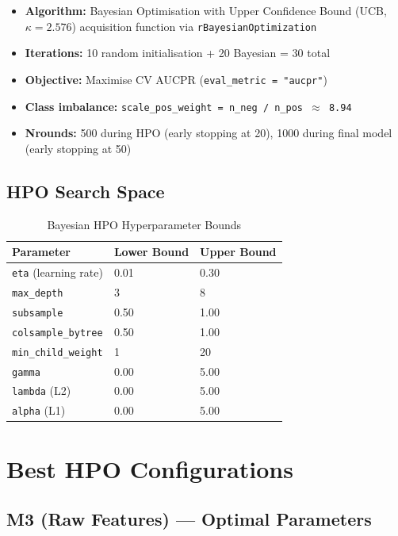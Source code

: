 \documentclass{report}\usepackage[]{graphicx}\usepackage[table]{xcolor}
\begin{document}
\begin{itemize}
    \item \textbf{Algorithm:} Bayesian Optimisation with Upper Confidence Bound 
    (UCB, $\kappa = 2.576$) acquisition function via \texttt{rBayesianOptimization}
    \item \textbf{Iterations:} 10 random initialisation + 20 Bayesian = 30 total
    \item \textbf{Objective:} Maximise CV AUCPR (\texttt{eval\_metric = "aucpr"})
    \item \textbf{Class imbalance:} \texttt{scale\_pos\_weight = n\_neg / n\_pos $\approx$ 8.94}
    \item \textbf{Nrounds:} 500 during HPO (early stopping at 20), 
    1000 during final model (early stopping at 50)
\end{itemize}

\subsection{HPO Search Space}

\begin{table}[H]
\centering
\caption{Bayesian HPO Hyperparameter Bounds}
\begin{tabular}{lll}
\toprule
\textbf{Parameter} & \textbf{Lower Bound} & \textbf{Upper Bound} \\
\midrule
\texttt{eta} (learning rate) & 0.01 & 0.30 \\
\texttt{max\_depth} & 3 & 8 \\
\texttt{subsample} & 0.50 & 1.00 \\
\texttt{colsample\_bytree} & 0.50 & 1.00 \\
\texttt{min\_child\_weight} & 1 & 20 \\
\texttt{gamma} & 0.00 & 5.00 \\
\texttt{lambda} (L2) & 0.00 & 5.00 \\
\texttt{alpha} (L1) & 0.00 & 5.00 \\
\bottomrule
\end{tabular}
\end{table}

\section{Best HPO Configurations}

\subsection{M3 (Raw Features) — Optimal Parameters}
\end{document}
